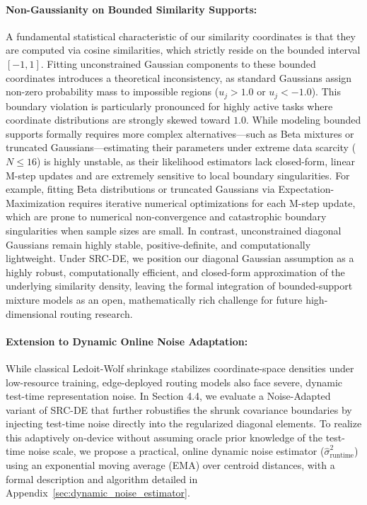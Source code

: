 \paragraph{Non-Gaussianity on Bounded Similarity Supports:} A fundamental statistical characteristic of our similarity coordinates is that they are computed via cosine similarities, which strictly reside on the bounded interval $[-1, 1]$. Fitting unconstrained Gaussian components to these bounded coordinates introduces a theoretical inconsistency, as standard Gaussians assign non-zero probability mass to impossible regions ($u_{j} > 1.0$ or $u_{j} < -1.0$). This boundary violation is particularly pronounced for highly active tasks where coordinate distributions are strongly skewed toward $1.0$. While modeling bounded supports formally requires more complex alternatives---such as Beta mixtures or truncated Gaussians---estimating their parameters under extreme data scarcity ($N \le 16$) is highly unstable, as their likelihood estimators lack closed-form, linear M-step updates and are extremely sensitive to local boundary singularities. For example, fitting Beta distributions or truncated Gaussians via Expectation-Maximization requires iterative numerical optimizations for each M-step update, which are prone to numerical non-convergence and catastrophic boundary singularities when sample sizes are small. In contrast, unconstrained diagonal Gaussians remain highly stable, positive-definite, and computationally lightweight. Under SRC-DE, we position our diagonal Gaussian assumption as a highly robust, computationally efficient, and closed-form approximation of the underlying similarity density, leaving the formal integration of bounded-support mixture models as an open, mathematically rich challenge for future high-dimensional routing research.

\paragraph{Extension to Dynamic Online Noise Adaptation:} While classical Ledoit-Wolf shrinkage stabilizes coordinate-space densities under low-resource training, edge-deployed routing models also face severe, dynamic test-time representation noise. In Section 4.4, we evaluate a Noise-Adapted variant of SRC-DE that further robustifies the shrunk covariance boundaries by injecting test-time noise directly into the regularized diagonal elements. To realize this adaptively on-device without assuming oracle prior knowledge of the test-time noise scale, we propose a practical, online dynamic noise estimator ($\hat{\sigma}^2_{\text{runtime}}$) using an exponential moving average (EMA) over centroid distances, with a formal description and algorithm detailed in Appendix~\ref{sec:dynamic_noise_estimator}.

